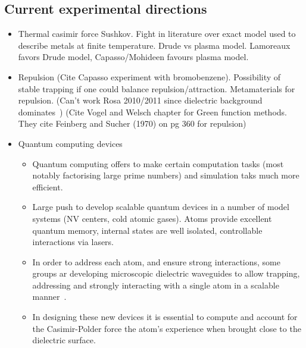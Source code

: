 \begin{itemize}
\subsection{Current experimental directions}
\begin{itemize}
\item Thermal casimir force
Sushkov\cite{Sushkov2011}.
Fight in literature over exact model used to describe metals at finite temperature.
Drude vs plasma model.  
 Lamoreaux favors Drude model, Capasso/Mohideen favours plasma model.
\item Repulsion (Cite Capasso experiment with bromobenzene).  Possibility of stable trapping
  if one could balance repulsion/attraction.  
 Metamaterials for repulsion.  (Can't work Rosa 2010/2011 since dielectric
  background dominates~\cite{Rosa2008})
  (Cite Vogel and Welsch chapter for Green function methods.  They cite 
  Feinberg and Sucher (1970) on pg 360 for repulsion)
\item Quantum computing devices
    \begin{itemize}
      \item Quantum computing offers to make certain computation tasks (most notably factorising 
        large prime numbers) and simulation taks much more efficient.  
      \item Large push to develop scalable quantum devices in a number of model systems
        (NV centers, cold atomic gases).  Atoms provide excellent quantum memory, internal
        states are well isolated, controllable interactions via lasers.  
      \item In order to address each atom, and ensure strong interactions, some groups 
        ar developing microscopic dielectric waveguides to allow trapping, addressing and strongly interacting with a 
        single atom in a scalable manner~\cite{Hung2013}.  
      \item In designing these new devices it is essential to compute and account for the Casimir-Polder force
        the atom's experience when brought close to the dielectric surface.  
    \end{itemize}
    



\end{itemize}
\end{itemize}
